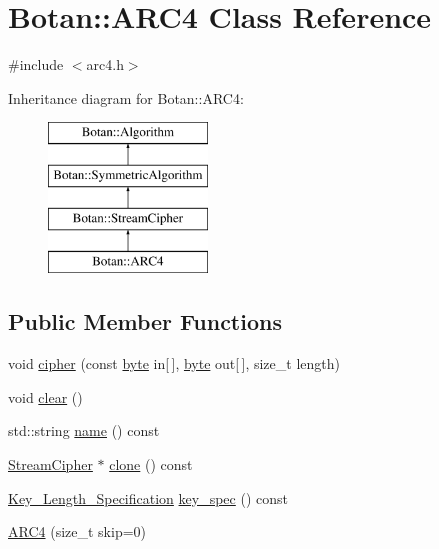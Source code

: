 \hypertarget{classBotan_1_1ARC4}{\section{Botan\-:\-:A\-R\-C4 Class Reference}
\label{classBotan_1_1ARC4}
}


{\ttfamily \#include $<$arc4.\-h$>$}

Inheritance diagram for Botan\-:\-:A\-R\-C4\-:\begin{figure}[H]
\begin{center}
\leavevmode
\includegraphics[height=4.000000cm]{classBotan_1_1ARC4}
\end{center}
\end{figure}
\subsection*{Public Member Functions}
\begin{DoxyCompactItemize}
\item 
void \hyperlink{classBotan_1_1ARC4_a88e1abaa501753b7a642f2e75d5df9c7}{cipher} (const \hyperlink{namespaceBotan_a7d793989d801281df48c6b19616b8b84}{byte} in\mbox{[}$\,$\mbox{]}, \hyperlink{namespaceBotan_a7d793989d801281df48c6b19616b8b84}{byte} out\mbox{[}$\,$\mbox{]}, size\-\_\-t length)
\item 
void \hyperlink{classBotan_1_1ARC4_a80782e1a4e4e0869eb818ca051cbef7b}{clear} ()
\item 
std\-::string \hyperlink{classBotan_1_1ARC4_aeb570d23ac0004111f10b35dae90adda}{name} () const 
\item 
\hyperlink{classBotan_1_1StreamCipher}{Stream\-Cipher} $\ast$ \hyperlink{classBotan_1_1ARC4_a78ccda8818d929f13db86e97ebf06cfb}{clone} () const 
\item 
\hyperlink{classBotan_1_1Key__Length__Specification}{Key\-\_\-\-Length\-\_\-\-Specification} \hyperlink{classBotan_1_1ARC4_a9139296ae024202c842c78c0a2ff27e6}{key\-\_\-spec} () const 
\item 
\hyperlink{classBotan_1_1ARC4_afa41c1c6b98c96c9dc5ac62b2d8b962f}{A\-R\-C4} (size\-\_\-t skip=0)
\end{DoxyCompactItemize}


